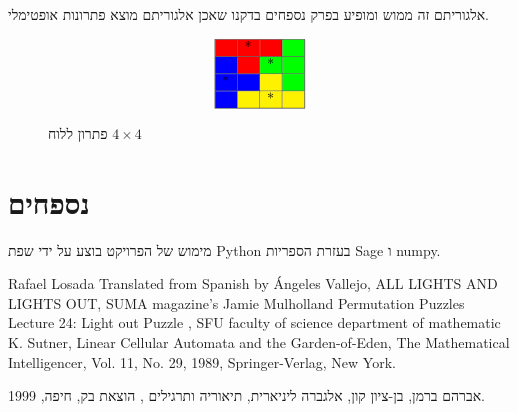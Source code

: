 \documentclass[12pt,leqno]{article}
\theoremstyle{theoremdd}
\begin{document}
אלגוריתם זה ממוש ומופיע בפרק נספחים בדקנו שאכן אלגוריתם מוצא פתרונות אופטימלי.

\begin{figure}[ht]
    \caption{פתרון ללוח 
    $4 \times 4$}
    \label{fig:4x4_have_min_sol}
    \centering
    \[\begin{array}{|p{0.2cm}|p{0.2cm}|p{0.2cm}|p{0.2cm}|}
        \hline
        \cellcolor{red} &\cellcolor{red}* &\cellcolor{red}& \cellcolor{green} \\
        \hline
        \cellcolor{blue}& \cellcolor{red}  & \cellcolor{green}* & \cellcolor{green} \\
        \hline
        \cellcolor{blue}*& \cellcolor{blue}  & \cellcolor{yellow}  & \cellcolor{green} \\
        \hline
        \cellcolor{blue}& \cellcolor{yellow}  & \cellcolor{yellow} * & \cellcolor{yellow} \\
        \hline
    \end{array}\]
\end{figure}

\newpage
\section{נספחים}
מימוש של הפרויקט בוצע על ידי 
שפת 
{Python}
בעזרת הספריות
{Sage}
ו
numpy.

\newpage
{
    \begin{thebibliography}{99}
        \begin{english}
        Rafael Losada
        Translated from Spanish by Ángeles Vallejo,
            ALL LIGHTS AND LIGHTS OUT,
        SUMA magazine’s 
        Jamie Mulholland
            Permutation Puzzles
        Lecture 24: Light out Puzzle , SFU faculty of science department of mathematic
        K. Sutner, Linear Cellular Automata and the Garden-of-Eden, The Mathematical Intelligencer, Vol. 11, No. 29, 1989, Springer-Verlag, New York.		
        \end{english}
        אברהם ברמן, בן-ציון קון, 
        אלגברה ליניארית, תיאוריה ותרגילים
        , הוצאת בק, חיפה, 1999.
        \end{thebibliography}
}
\end{document}
